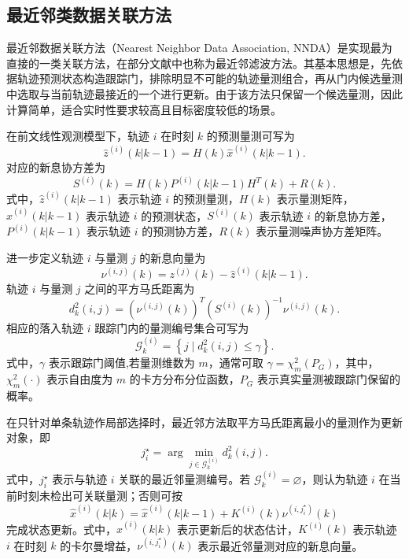 \documentclass{xdupgthesis}
\begin{document}
\subsection{最近邻类数据关联方法}


最近邻数据关联方法（Nearest Neighbor Data Association, NNDA）是实现最为直接的一类关联方法，在部分文献中也称为最近邻滤波方法\cite{sea1971suboptimal}。其基本思想是，先依据轨迹预测状态构造跟踪门，排除明显不可能的轨迹量测组合，再从门内候选量测中选取与当前轨迹最接近的一个进行更新。由于该方法只保留一个候选量测，因此计算简单，适合实时性要求较高且目标密度较低的场景。

在前文线性观测模型下，轨迹 $i$ 在时刻 $k$ 的预测量测可写为
\begin{equation}
	\hat{z}^{(i)}(k|k-1)
	=
	H(k)\hat{x}^{(i)}(k|k-1).
\end{equation}
对应的新息协方差为
\begin{equation}
	S^{(i)}(k)
	=
	H(k)P^{(i)}(k|k-1)H^{T}(k)
	+
	R(k).
\end{equation}
式中，$\hat{z}^{(i)}(k|k-1)$ 表示轨迹 $i$ 的预测量测，$H(k)$ 表示量测矩阵，$\hat{x}^{(i)}(k|k-1)$ 表示轨迹 $i$ 的预测状态，$S^{(i)}(k)$ 表示轨迹 $i$ 的新息协方差，$P^{(i)}(k|k-1)$ 表示轨迹 $i$ 的预测协方差，$R(k)$ 表示量测噪声协方差矩阵。

进一步定义轨迹 $i$ 与量测 $j$ 的新息向量为
\begin{equation}
	\nu^{(i,j)}(k)
	=
	z^{(j)}(k)-\hat{z}^{(i)}(k|k-1).
\end{equation}
轨迹 $i$ 与量测 $j$ 之间的平方马氏距离为
\begin{equation}
	d_k^2(i,j)
	=
	\left(
	\nu^{(i,j)}(k)
	\right)^{T}
	\left(
	S^{(i)}(k)
	\right)^{-1}
	\nu^{(i,j)}(k).
\end{equation}
相应的落入轨迹 $i$ 跟踪门内的量测编号集合可写为
\begin{equation}
	\mathcal{G}^{(i)}_k
	=
	\left\{
	j \mid d_k^2(i,j)\le \gamma
	\right\}.
\end{equation}
式中，$\gamma$ 表示跟踪门阈值,若量测维数为 $m$，通常可取 $\gamma=\chi_m^2(P_G)$，其中，$\chi_m^2(\cdot)$ 表示自由度为 $m$ 的卡方分布分位函数，$P_G$ 表示真实量测被跟踪门保留的概率。

在只针对单条轨迹作局部选择时，最近邻方法取平方马氏距离最小的量测作为更新对象，即
\begin{equation}
	j_i^\star
	=
	\arg\min_{j\in\mathcal{G}^{(i)}_k}
	d_k^2(i,j).
\end{equation}
式中，$j_i^\star$ 表示与轨迹 $i$ 关联的最近邻量测编号。若 $\mathcal{G}^{(i)}_k=\varnothing$，则认为轨迹 $i$ 在当前时刻未检出可关联量测；否则可按
\begin{equation}
	\hat{x}^{(i)}(k|k)
	=
	\hat{x}^{(i)}(k|k-1)
	+
	K^{(i)}(k)\nu^{(i,j_i^\star)}(k)
\end{equation}
完成状态更新。式中，$\hat{x}^{(i)}(k|k)$ 表示更新后的状态估计，$K^{(i)}(k)$ 表示轨迹 $i$ 在时刻 $k$ 的卡尔曼增益，$\nu^{(i,j_i^\star)}(k)$ 表示最近邻量测对应的新息向量。
\end{document}
